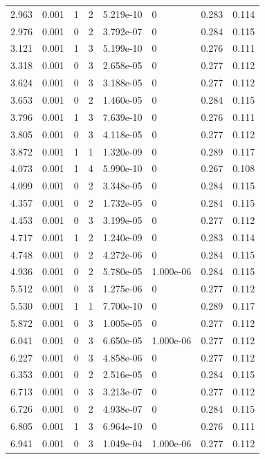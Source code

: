 \documentclass[preview]{standalone}
\begin{document}
{{\begin{tabular}{L{1.2cm}C{1.2cm} C{0.3cm}C{0.5cm} C{1.4cm}C{1.4cm} C{1.4cm}C{1.4cm}}
  2.963  &  0.001  & 1     &  2 &  5.219e-10  & 0  & 0.283 &  0.114   \\ 
  2.976  &  0.001  & 0     &  2 &  3.792e-07  & 0  & 0.284 &  0.115   \\ 
  3.121  &  0.001  & 1     &  3 &  5.199e-10  & 0  & 0.276 &  0.111   \\ 
  3.318  &  0.001  & 0     &  3 &  2.658e-05  & 0  & 0.277 &  0.112   \\ 
  3.624  &  0.001  & 0     &  3 &  3.188e-05  & 0  & 0.277 &  0.112   \\ 
  3.653  &  0.001  & 0     &  2 &  1.460e-05  & 0  & 0.284 &  0.115   \\ 
  3.796  &  0.001  & 1     &  3 &  7.639e-10  & 0  & 0.276 &  0.111   \\ 
  3.805  &  0.001  & 0     &  3 &  4.118e-05  & 0  & 0.277 &  0.112   \\ 
  3.872  &  0.001  & 1     &  1 &  1.320e-09  & 0  & 0.289 &  0.117   \\ 
  4.073  &  0.001  & 1     &  4 &  5.990e-10  & 0  & 0.267 &  0.108   \\ 
  4.099  &  0.001  & 0     &  2 &  3.348e-05  & 0  & 0.284 &  0.115   \\ 
  4.357  &  0.001  & 0     &  2 &  1.732e-05  & 0  & 0.284 &  0.115   \\ 
  4.453  &  0.001  & 0     &  3 &  3.199e-05  & 0  & 0.277 &  0.112   \\ 
  4.717  &  0.001  & 1     &  2 &  1.240e-09  & 0  & 0.283 &  0.114   \\ 
  4.748  &  0.001  & 0     &  2 &  4.272e-06  & 0  & 0.284 &  0.115   \\ 
  4.936  &  0.001  & 0     &  2 &  5.780e-05  & 1.000e-06  & 0.284 &  0.115   \\ 
  5.512  &  0.001  & 0     &  3 &  1.275e-06  & 0  & 0.277 &  0.112   \\ 
  5.530  &  0.001  & 1     &  1 &  7.700e-10  & 0  & 0.289 &  0.117   \\ 
  5.872  &  0.001  & 0     &  3 &  1.005e-05  & 0  & 0.277 &  0.112   \\ 
  6.041  &  0.001  & 0     &  3 &  6.650e-05  & 1.000e-06  & 0.277 &  0.112   \\ 
  6.227  &  0.001  & 0     &  3 &  4.858e-06  & 0  & 0.277 &  0.112   \\ 
  6.353  &  0.001  & 0     &  2 &  2.516e-05  & 0  & 0.284 &  0.115   \\ 
  6.713  &  0.001  & 0     &  3 &  3.213e-07  & 0  & 0.277 &  0.112   \\ 
  6.726  &  0.001  & 0     &  2 &  4.938e-07  & 0  & 0.284 &  0.115   \\ 
  6.805  &  0.001  & 1     &  3 &  6.964e-10  & 0  & 0.276 &  0.111   \\ 
  6.941  &  0.001  & 0     &  3 &  1.049e-04  & 1.000e-06  & 0.277 &  0.112   \\ 
\hline 
\end{tabular} 

}}
\end{document}
